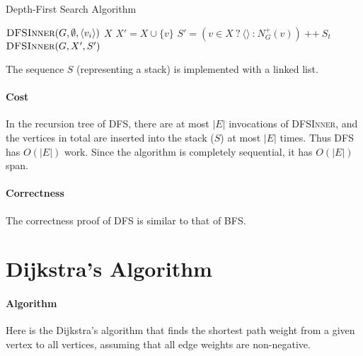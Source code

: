 \documentclass[11pt,a4paper,oneside,microtype,nokorean]{oblivoir}
\begin{document}
\begin{algorithm}
  \caption{Depth-First Search Algorithm}\label{dfs}
  \begin{algorithmic}[1]
     
    \State $\Call{DFSInner}{G,\emptyset,\langle v_i\rangle}$
    \EndProcedure
    \Statex
     
    \State $X$
    \EndCase
    \State $X' = X \cup \{v\}$
    \State $S' = (v \in X~\texttt{?}~\langle \rangle~\texttt{:}~N^+_G(v))~\texttt{++}~S_t$
    \State $\Call{DFSInner}{G,X',S'}$
    \EndCase
    \EndSwitch
    \EndProcedure
  \end{algorithmic}
\end{algorithm}

The sequence $S$ (representing a stack) is implemented with a linked list.


\paragraph{Cost}

In the recursion tree of \textsc{DFS}, there are at most $|E|$ invocations of \textsc{DFSInner}, and
the vertices in total are inserted into the stack ($S$) at most $|E|$ times.  Thus \textsc{DFS} has
$O(|E|)$ work.  Since the algorithm is completely sequential, it has $O(|E|)$ span.



\paragraph{Correctness} The correctness proof of DFS is similar to that of BFS.



\section{Dijkstra's Algorithm}

\paragraph{Algorithm}

Here is the Dijkstra's algorithm that finds the shortest path weight from a given vertex to all
vertices, assuming that all edge weights are non-negative.
\end{document}
